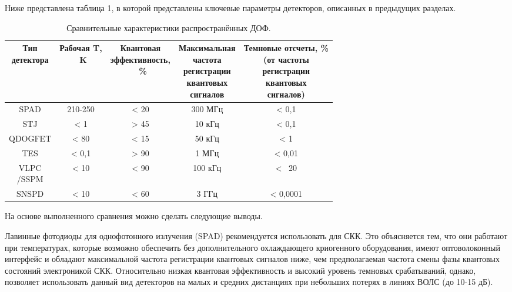 Ниже представлена таблица 1, в которой представлены ключевые параметры детекторов, описанных в предыдущих разделах.

\begin{table} [htbp]
	\centering
	\caption{Сравнительные характеристики распространённых ДОФ.}
	\label{tab:SPD_compare}
	\begin{tabular}{| c | c | c | c | c |}
	
	 \hline \makecell{Тип \\детектора} & \makecell{Рабочая T,\\~K} & \makecell{Квантовая \\эффективность,\\~\%} & \makecell{Максимальная \\частота \\регистрации \\квантовых \\сигналов} & \makecell{Темновые отсчеты, \% \\(от частоты \\регистрации \\квантовых \\сигналов)}   \\ \hline
	  SPAD         & 210-250    & < 20    & 300 МГц     & < 0,1   \\ \hline
	  STJ	   	   & < 1        & > 45    & 10 кГц  	& < 0,1      \\ \hline
	  QDOGFET      & < 80       & < 15    & 50 кГц      & < 1       \\ \hline
	  TES          & < 0,1      & > 90    & 1 МГц       & < 0,01       \\ \hline
	  \makecell{VLPC\\/SSPM} & < 10      & < 90    & 100 кГц       & < ~20      \\ \hline
	  SNSPD          & < 10      & < 60    & 3 ГГц       & < 0,0001       \\ \hline
	  
	\end{tabular}
\end{table}

На основе выполненного сравнения можно сделать следующие выводы. 


Лавинные фотодиоды для однофотонного излучения (SPAD) рекомендуется использовать для СКК. Это объясняется тем, что они работают при температурах, которые возможно обеспечить без дополнительного охлаждающего криогенного оборудования, имеют оптоволоконный интерфейс и обладают максимальной частота регистрации квантовых сигналов ниже, чем предполагаемая частота смены фазы квантовых состояний электроникой СКК. Относительно низкая квантовая эффективность и высокий уровень темновых срабатываний, однако, позволяет использовать данный вид детекторов на малых и средних дистанциях при небольших потерях в линиях ВОЛС (до 10-15 дБ).


